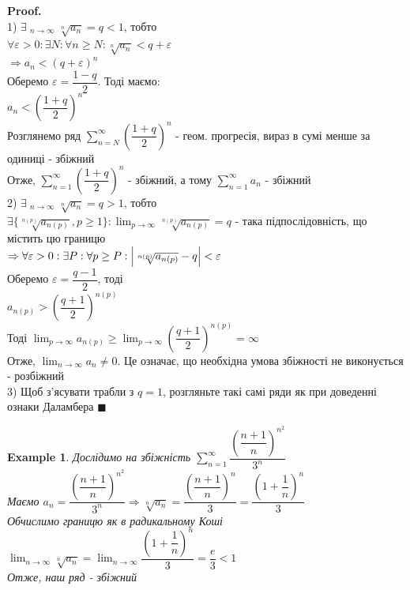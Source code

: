 \documentclass[a4paper, 14pt]{extarticle}
\DeclareMathOperator*\uplim{\overline{lim}}
\def\huge{\displaystyle}
\def\bigline{\vspace{5mm}\\}
\theoremstyle{theoremdd}
\theoremstyle{theoremdd}
\theoremstyle{theoremdd}
\theoremstyle{theoremdd}
\newtheorem{example}[theorem]{Example}
\theoremstyle{theoremdd}
\theoremstyle{theoremdd}
\theoremstyle{theoremdd}
\theoremstyle{theoremdd}
\newenvironment{pf}{\vspace*{-3mm} \textbf{Proof. \\}}{$\blacksquare$}
\begin{document}
\begin{pf}
1) $\exists \huge \uplim_{n \to \infty} \sqrt[n]{a_n} = q < 1$, тобто\\
$\forall \varepsilon > 0: \exists N: \forall n \geq N: \sqrt[n]{a_n} < q + \varepsilon$\\
$\Rightarrow a_n < (q + \varepsilon)^n$\\
Оберемо $\varepsilon = \dfrac{1-q}{2}$. Тоді маємо:\\
$a_n < \left( \dfrac{1+q}{2} \right)^n$\\
Розглянемо ряд $\huge \sum_{n = N}^{\infty} \left( \dfrac{1+q}{2} \right)^n$ - геом. прогресія, вираз в сумі менше за одиниці - збіжний\\
Отже, $\huge \sum_{n = 1}^{\infty} \left( \dfrac{1+q}{2} \right)^n$ - збіжний, а тому $\huge \sum_{n=1}^{\infty} a_n$ - збіжний
\bigline
2) $\exists \huge \uplim_{n \to \infty} \sqrt[n]{a_n} = q > 1$, тобто\\
$\exists \{\sqrt[n(p)]{a_{n(p)}}, p \geq 1 \}: \huge \lim_{p \to \infty} \sqrt[n(p)]{a_{n(p)}} = q$ - така підпослідовність, що містить цю границю\\
$\Rightarrow \forall \varepsilon > 0: \exists P: \forall p \geq P: \abs{\sqrt[n(p)]{a_{n(p)}} - q} < \varepsilon$\\
Оберемо $\varepsilon = \dfrac{q-1}{2}$, тоді\\
$a_{n(p)} > \left( \dfrac{q+1}{2} \right)^{n(p)}$\\
Тоді $\huge \lim_{p \to \infty} a_{n(p)} \geq \lim_{p \to \infty} \left( \dfrac{q+1}{2} \right)^{n(p)} = \infty$\\
Отже, $\huge \lim_{n \to \infty} a_n \neq 0$. Це означає, що необхідна умова збіжності не виконується - розбіжний
\bigline
3) Щоб з'ясувати трабли з $q=1$, розгляньте такі самі ряди як при доведенні ознаки Даламбера
\end{pf}

\begin{example}
Дослідимо на збіжність $\huge\sum_{n=1}^\infty \dfrac{\left( \dfrac{n+1}{n} \right)^{n^2}}{3^n}$\\
Маємо $a_n = \dfrac{\left( \dfrac{n+1}{n} \right)^{n^2}}{3^n} \Rightarrow \sqrt[n]{a_n} = \dfrac{\left( \dfrac{n+1}{n} \right)^n}{3} = \dfrac{\left( 1 + \dfrac{1}{n} \right)^n}{3}$\\
Обчислимо границю як в радикальному Коші\\
$\huge\lim_{n \to \infty} \sqrt[n]{a_n} = \lim_{n \to \infty} \dfrac{\left( 1 + \dfrac{1}{n} \right)^n}{3} = \dfrac{e}{3} < 1$\\
Отже, наш ряд - збіжний
\end{example}
\end{document}
